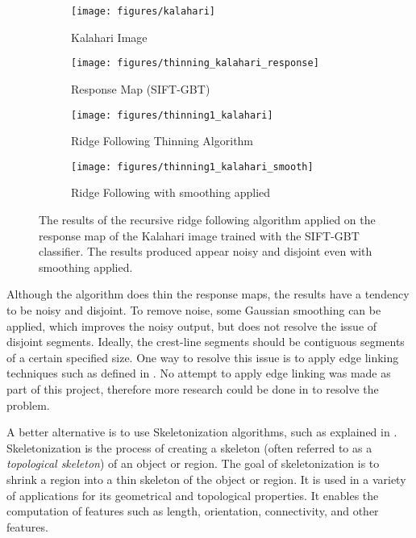 \begin{figure}
	\centering
	\begin{subfigure}{0.48\textwidth}
		\centering
		\texttt{[image: figures/kalahari]}
		\caption{Kalahari Image}
		\label{fig:thinning_kalahari}
	\end{subfigure}
	\begin{subfigure}{0.48\textwidth}
		\centering
		\texttt{[image: figures/thinning\_kalahari\_response]}
		\caption{ Response Map (SIFT-GBT) }
		\label{fig:thinning_kalahari_response}
	\end{subfigure}
	\begin{subfigure}{0.8\textwidth}
		\centering
		\texttt{[image: figures/thinning1\_kalahari]}
		\caption{ Ridge Following Thinning Algorithm }
		\label{fig:thinning1_kalahari}
	\end{subfigure}
	\begin{subfigure}{0.8\textwidth}
		\centering
		\texttt{[image: figures/thinning1\_kalahari\_smooth]}
		\caption{ Ridge Following with smoothing applied }
		\label{fig:thinning1_kalahari_smooth}
	\end{subfigure}
	\caption{The results of the recursive ridge following algorithm applied on the response map of the Kalahari image trained with the SIFT-GBT classifier. The results produced appear noisy and disjoint even with smoothing applied. }
	\label{fig:ridge_follow_results}
\end{figure}

Although the algorithm does thin the response maps, the results have a tendency to be noisy and disjoint. To remove noise, some Gaussian smoothing can be applied, which improves the noisy output, but does not resolve the issue of disjoint segments. Ideally, the crest-line segments should be contiguous segments of a certain specified size. One way to resolve this issue is to apply edge linking techniques such as defined in \cite{1986_canny_edge_detection}. No attempt to apply edge linking was made as part of this project, therefore more research could be done in to resolve the problem.

A better alternative is to use Skeletonization algorithms, such as explained in \cite{segmentation-free-skeletonization-grayscale-volumes,skeleton-pruning-contour-partitioning-discrete-curve-evolution,automatic-medial-axis-pruning-mapping-characteristics,fast-parallel-algorithm-thinning}. Skeletonization is the process of creating a skeleton (often referred to as a \emph{topological skeleton}) of an object or region. The goal of skeletonization is to shrink a region into a thin skeleton of the object or region. It is used in a variety of applications for its geometrical and topological properties. It enables the computation of features such as length, orientation, connectivity, and other features. 

